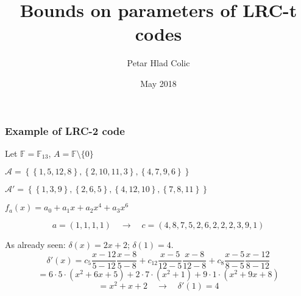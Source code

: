 \documentclass[envcountsect]{beamer}
\title{Bounds on parameters of LRC-t codes}
\author{Petar Hlad Colic}
\institute{Universitat Polit\`ecnica de Catalunya}
\date{May 2018}
\newcommand{\FF}{\mathbb{F}}
\begin{document}
    \frame{\titlepage}
    
    \frame{\tableofcontents}
    
    
    
    
    
    
    
    \begin{frame}
        \frametitle{Example of LRC-2 code}
        
        Let $\FF = \FF_{13}$, $A = \FF \setminus \{0\}$
        
        $\mathcal{A} = \left\lbrace  \left\lbrace 1, 5, 12 , 8 \right\rbrace, \left\lbrace 2 , 10 , 11 , 3 \right\rbrace , \left\lbrace 4 , 7 , 9 , 6 \right\rbrace \right\rbrace$
        
        $\mathcal{A'} = \left\lbrace  \left\lbrace 1 , 3 , 9 \right\rbrace, \left\lbrace 2 , 6 , 5 \right\rbrace , \left\lbrace 4 , 12 , 10 \right\rbrace , \left\lbrace 7 , 8 , 11 \right\rbrace \right\rbrace$
        
        $f_a(x) = a_0 + a_1 x + a_2 x^4 + a_3 x^6$
        
        $$a = (1,1,1,1) \quad \longrightarrow \quad c = (4,8,7,5,2,6,2,2,2,3,9,1)$$
        
        As already seen: $\delta(x) = 2x + 2$; $\delta(1)=4$.
        $$\delta ' (x) = c_5 \frac{x-12}{5-12}\frac{x-8}{5-8} + c_{12} \frac{x-5}{12-5}\frac{x-8}{12-8} + c_8 \frac{x-5}{8-5}\frac{x-12}{8-12}$$
        $$ = 6 \cdot 5 \cdot (x^2 + 6x + 5) + 2 \cdot 7 \cdot (x^2 + 1) + 9 \cdot 1 \cdot (x^2 + 9x + 8)$$
        $$ = x^2 + x + 2 \quad \longrightarrow \quad \delta ' (1) = 4$$
    \end{frame}        
    
    
    
    
\end{document}
